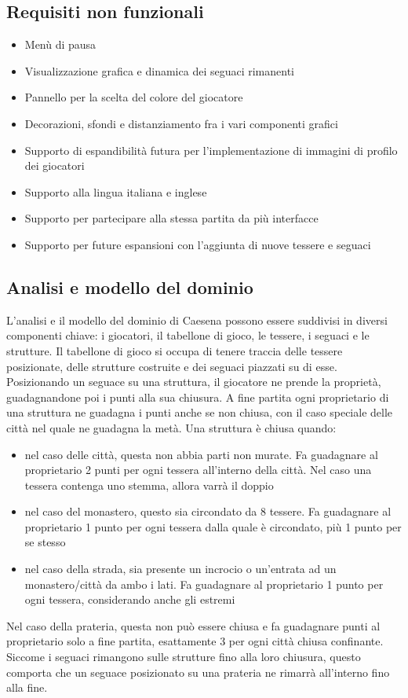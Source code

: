\subsection*{Requisiti non funzionali}
\begin{itemize}
\item Menù di pausa
\item Visualizzazione grafica e dinamica dei seguaci rimanenti
\item Pannello per la scelta del colore del giocatore
\item Decorazioni, sfondi e distanziamento fra i vari componenti grafici
\item Supporto di espandibilità futura per l'implementazione di immagini di profilo dei giocatori
\item Supporto alla lingua italiana e inglese
\item Supporto per partecipare alla stessa partita da più interfacce
\item Supporto per future espansioni con l'aggiunta di nuove tessere e seguaci
\end{itemize}

\subsection{Analisi e modello del dominio}

L'analisi e il modello del dominio di Caesena possono essere suddivisi in diversi componenti chiave: i giocatori, il tabellone di gioco, le tessere, i seguaci e le strutture. Il tabellone di gioco si occupa di tenere traccia delle tessere posizionate, delle  strutture costruite e dei seguaci piazzati su di esse. Posizionando un seguace su una struttura, il giocatore ne prende la proprietà, guadagnandone poi i punti alla sua chiusura. A fine partita ogni proprietario di una struttura ne guadagna i punti anche se non chiusa, con il caso speciale delle città nel quale ne guadagna la metà. Una struttura è chiusa quando:
\begin{itemize}
    \item nel caso delle città, questa non abbia parti non murate. Fa guadagnare al proprietario 2 punti per ogni tessera all'interno della città. Nel caso una tessera contenga uno stemma, allora varrà il doppio
    \item nel caso del monastero, questo sia circondato da 8 tessere. Fa guadagnare al proprietario 1 punto per ogni tessera dalla quale è circondato, più 1 punto per se stesso
    \item nel caso della strada, sia presente un incrocio o un'entrata ad un monastero/città da ambo i lati. Fa guadagnare al proprietario 1 punto per ogni tessera, considerando anche gli estremi
\end{itemize}
Nel caso della prateria, questa non può essere chiusa e fa guadagnare punti al proprietario solo a fine partita, esattamente 3 per ogni città chiusa confinante. Siccome i seguaci rimangono sulle strutture fino alla loro chiusura, questo comporta che un seguace posizionato su una prateria ne rimarrà all'interno fino alla fine.

